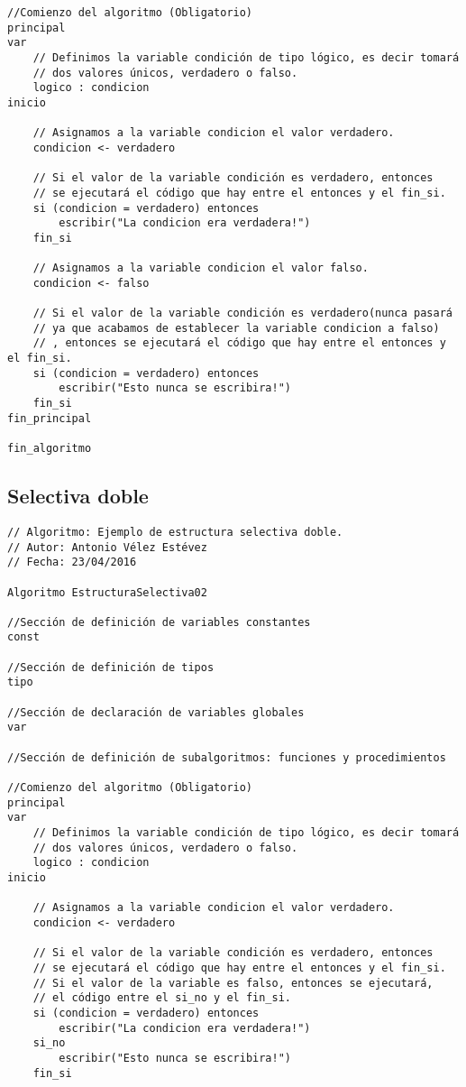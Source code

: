 \documentclass{article}
\begin{document}
\begin{appendices}
\begin{lstlisting}[language = pseudocodigoesp]
//Comienzo del algoritmo (Obligatorio)
principal	
var
	// Definimos la variable condición de tipo lógico, es decir tomará
	// dos valores únicos, verdadero o falso.
	logico : condicion
inicio 	

	// Asignamos a la variable condicion el valor verdadero.
	condicion <- verdadero
	
	// Si el valor de la variable condición es verdadero, entonces
	// se ejecutará el código que hay entre el entonces y el fin_si.
	si (condicion = verdadero) entonces
		escribir("La condicion era verdadera!")
	fin_si
	
	// Asignamos a la variable condicion el valor falso.
	condicion <- falso
	
	// Si el valor de la variable condición es verdadero(nunca pasará
	// ya que acabamos de establecer la variable condicion a falso)
	// , entonces se ejecutará el código que hay entre el entonces y el fin_si.
	si (condicion = verdadero) entonces 
		escribir("Esto nunca se escribira!")
	fin_si
fin_principal

fin_algoritmo

\end{lstlisting}

  \subsection{Selectiva doble}
\begin{lstlisting}[language = pseudocodigoesp]
// Algoritmo: Ejemplo de estructura selectiva doble.
// Autor: Antonio Vélez Estévez
// Fecha: 23/04/2016

Algoritmo EstructuraSelectiva02

//Sección de definición de variables constantes
const 
	
//Sección de definición de tipos
tipo

//Sección de declaración de variables globales	
var

//Sección de definición de subalgoritmos: funciones y procedimientos	

//Comienzo del algoritmo (Obligatorio)
principal	
var
	// Definimos la variable condición de tipo lógico, es decir tomará
	// dos valores únicos, verdadero o falso.
	logico : condicion
inicio 	

	// Asignamos a la variable condicion el valor verdadero.
	condicion <- verdadero
	
	// Si el valor de la variable condición es verdadero, entonces
	// se ejecutará el código que hay entre el entonces y el fin_si.
	// Si el valor de la variable es falso, entonces se ejecutará,
	// el código entre el si_no y el fin_si.
	si (condicion = verdadero) entonces
		escribir("La condicion era verdadera!")
	si_no
		escribir("Esto nunca se escribira!")
	fin_si


\end{lstlisting}
\end{appendices}
\end{document}
